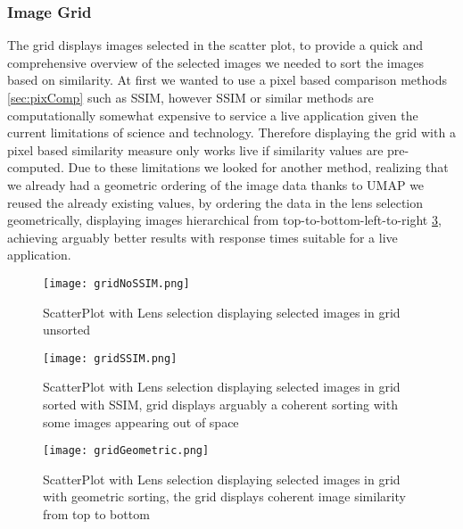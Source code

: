 \documentclass[
  a4paper,  %
  twoside,  %
  bibliography=totoc,
  headsepline,
  cleardoublepage=empty,
  parskip=half,
  draft=false
]{scrbook}
\begin{document}
\subsubsection{Image Grid}
\label{sec: grid}
The grid displays images selected in the scatter plot, to provide a quick and comprehensive overview of the selected images we needed to sort the images based on similarity.
At first we wanted to use a pixel based comparison methods \cref{sec:pixComp} such as SSIM, however SSIM or similar methods are computationally somewhat expensive to service a live application given the current limitations of science and technology.  Therefore displaying the grid with a pixel based similarity measure only works live if similarity values are pre-computed.
Due to these limitations we looked for another method, realizing that we already had a geometric ordering of the image data thanks to UMAP we reused the already existing values, by ordering the data in the lens selection geometrically, displaying images hierarchical from top-to-bottom-left-to-right \cref{fig:scatterGeometric}, achieving arguably better results with response times suitable for a live application.
\begin{figure}[H]
	\centering
	\texttt{[image: gridNoSSIM.png]}
	\caption{ScatterPlot with Lens selection displaying selected images in grid unsorted}
	\label{fig:scatterNoSSIM}
\end{figure}
\begin{figure}[H]
	\centering
	\texttt{[image: gridSSIM.png]}
	\caption{ScatterPlot with Lens selection displaying selected images in grid sorted with SSIM, grid displays arguably a coherent sorting with some images appearing out of space}
	\label{fig:scatterSSIM}
\end{figure}
\begin{figure}[H]
	\centering
	\texttt{[image: gridGeometric.png]}
	\caption{ScatterPlot with Lens selection displaying selected images in grid with geometric sorting, the grid displays coherent image similarity from top to bottom}
	\label{fig:scatterGeometric}
\end{figure}
\end{document}
